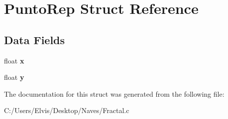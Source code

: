\hypertarget{struct_punto_rep}{}\section{Punto\+Rep Struct Reference}
\label{struct_punto_rep}
\subsection*{Data Fields}
\begin{DoxyCompactItemize}
\item 
float {\bfseries x}\hypertarget{struct_punto_rep_ad0da36b2558901e21e7a30f6c227a45e}{}\label{struct_punto_rep_ad0da36b2558901e21e7a30f6c227a45e}

\item 
float {\bfseries y}\hypertarget{struct_punto_rep_aa4f0d3eebc3c443f9be81bf48561a217}{}\label{struct_punto_rep_aa4f0d3eebc3c443f9be81bf48561a217}

\end{DoxyCompactItemize}


The documentation for this struct was generated from the following file\+:\begin{DoxyCompactItemize}
\item 
C\+:/\+Users/\+Elvis/\+Desktop/\+Naves/Fractal.\+c\end{DoxyCompactItemize}
